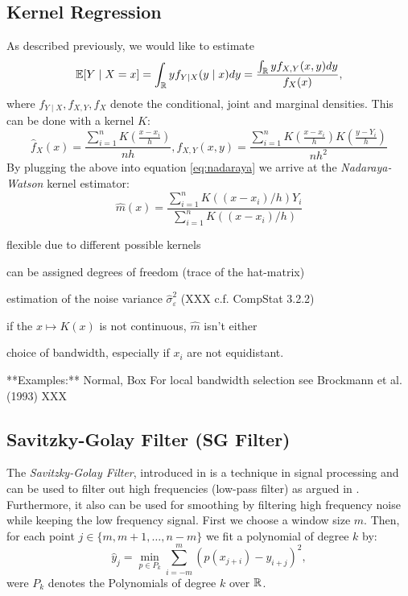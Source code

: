 \subsection{Kernel Regression}
\label{sec:Kernel}
As described previously, we would like to estimate
\begin{equation}
  \label{eq:nadaraya}
  \mathbb{E}[Y \mid X=x]
  = \int_{\mathbb{R}} y f_{Y \mid X}(y \mid x) d y
  =\frac{\int_{\mathbb{R}} y f_{X, Y}(x, y) d y}{f_{X}(x)},
\end{equation}
where $f_{Y \mid X}, f_{X, Y}, f_{X}$ denote the conditional, joint and marginal densities.
This can be done with a kernel $K$:
$$
  \hat{f}_{X}(x)=\frac{\sum_{i=1}^{n} K\left(\frac{x-x_{i}}{h}\right)}{n h}, \hat{f}_{X, Y}(x, y)=\frac{\sum_{i=1}^{n} K\left(\frac{x-x_{i}}{h}\right) K\left(\frac{y-Y_{i}}{h}\right)}{n h^{2}}
$$
By plugging the above into equation \ref{eq:nadaraya} we arrive at the \textit{Nadaraya-Watson} kernel estimator:
$$\hat{m}(x)=\frac{\sum_{i=1}^{n} K\left(\left(x-x_{i}\right) / h\right) Y_{i}}{\sum_{i=1}^{n} K\left(\left(x-x_{i}\right) / h\right)}$$


\begin{my_pros_cons_table}{
    \item flexible due to different possible kernels
    \item can be assigned degrees of freedom (trace of the hat-matrix)
    \item estimation of the noise variance $\hat \sigma_\varepsilon^2$ (XXX c.f. CompStat 3.2.2)
  }{
    \item if the $x \mapsto K(x)$ is not continuous, $\hat m $ isn't either
    \item choice of bandwidth, especially if $x_i$ are not equidistant.
  }
\end{my_pros_cons_table}


**Examples:**
Normal, Box
For local bandwidth selection see Brockmann et al. (1993) XXX


\subsection{Savitzky-Golay Filter (SG Filter)}
\label{sec:Savitzky–Golay}
The \textit{Savitzky-Golay Filter}, introduced in \cite{savitzkySmoothingDifferentiationData1964} is a technique in signal processing and can be used to filter out high frequencies (low-pass filter) as argued in \cite{schaferWhatSavitzkyGolayFilter2011}. Furthermore, it also can be used for smoothing by filtering high frequency noise while keeping the low frequency signal.
First we choose a window size $m$. Then, for each point $j \in \{m, m+1, \dots, n-m\}$ we fit a polynomial of degree $k$ by:
$$\hat y_j=\min_{p\in P_k}\sum_{i=-m}^{m}(p (x_{j+i})-y_{i+j})^{2},$$
were $P_k$ denotes the Polynomials of degree $k$ over $\mathbb{R}$.

